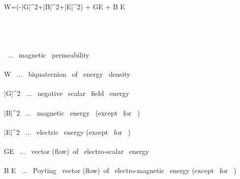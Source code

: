 \mu  \widehat W=(-|G|^2+|\vec B|^2+|\vec E|^2) +\imath {} G\vec E +\imath {} \vec B \times \vec E \\\\\\

\\\\

\mu \ ... \ magnetic \ permeability \\\\
\widehat W \ ... \ biquaternion \ of \ energy \ density \\\\
|G|^2 \ ... \  negative \ scalar \ field \ energy \\\\
|\vec B|^2 \ ... \ magnetic \ energy \ (except \ for \ \mu) \\\\
|\vec E|^2 \ ... \ electric \ energy (except \ for \ \mu) \\\\
 G\vec E \ ... \ vector (flow)\ of \ electro-scalar \ energy \\\\
 \vec B \times \vec E \ ... \ Poyting \ vector (flow)\ of \ electro-magnetic \ energy (except \ for \ \mu)
